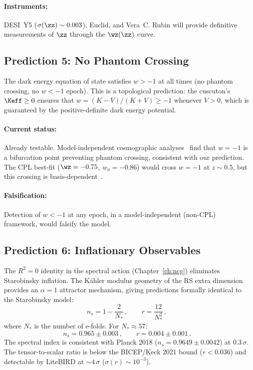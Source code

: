 \paragraph{Instruments:} DESI~Y5 ($\sigma(\zz) \sim 0.003$), Euclid, and Vera~C. Rubin will provide definitive measurements of $\zz$ through the $\wz(\zz)$ curve.

\subsection{Prediction 5: No Phantom Crossing}
\label{sec:1-pred5}

The dark energy equation of state satisfies $w > -1$ at all times (no phantom crossing, no $w < -1$ epoch). This is a topological prediction: the cuscuton's $\Keff \geq 0$ ensures that $w = (K - V)/(K + V) \geq -1$ whenever $V > 0$, which is guaranteed by the positive-definite dark energy potential.

\paragraph{Current status:} Already testable. Model-independent cosmographic analyses~\cite{ch1:mandal25} find that $w = -1$ is a bifurcation point preventing phantom crossing, consistent with our prediction. The CPL best-fit ($\wz = -0.75$, $w_a = -0.86$) would cross $w = -1$ at $z \sim 0.5$, but this crossing is basis-dependent~\cite{ch1:gomez25,ch1:lodha24,ch1:hasan25,ch1:mandal25,ch1:andrianomena25,ch1:marques25}.

\paragraph{Falsification:} Detection of $w < -1$ at any epoch, in a model-independent (non-CPL) framework, would falsify the model.

\subsection{Prediction 6: Inflationary Observables}
\label{sec:1-pred6}

The $R^2 = 0$ identity in the spectral action (Chapter~\ref{ch:ncg}) eliminates Starobinsky inflation. The K\"ahler modulus geometry of the RS extra dimension provides an $\alpha = 1$ attractor mechanism, giving predictions formally identical to the Starobinsky model:
\begin{equation}
\label{eq:1-inflation-pred}
n_s = 1 - \frac{2}{N_*}\,,\qquad r = \frac{12}{N_*^2}\,,
\end{equation}
where $N_*$ is the number of e-folds. For $N_* \approx 57$:
\begin{equation}
\label{eq:1-inflation-values}
n_s = 0.965 \pm 0.003\,,\qquad r = 0.004 \pm 0.001\,.
\end{equation}
The spectral index is consistent with Planck 2018 ($n_s = 0.9649 \pm 0.0042$) at $0.3\,\sigma$. The tensor-to-scalar ratio is below the BICEP/Keck 2021 bound ($r < 0.036$) and detectable by LiteBIRD at $\sim\!4\,\sigma$ ($\sigma(r) \sim 10^{-3}$).

